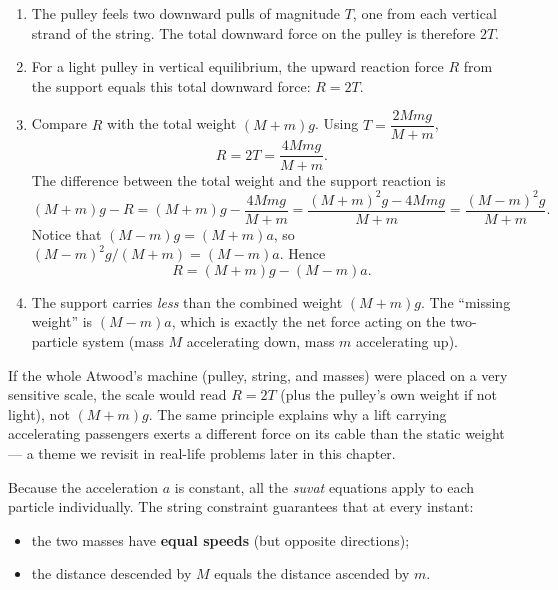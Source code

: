 \documentclass[11pt]{article}
\newcounter{popsec}
\newcounter{popsub}
\newcommand{\courssub}[1]{%
  \stepcounter{popsub}%
  \par\vspace{9pt}\noindent{\popxbold\fontsize{11.5}{13}\selectfont\color{popink}{\color{poporange}\thepopsec.\thepopsub}\hspace{6pt}#1}\par\nopagebreak\vspace{4pt}
}
\begin{document}
\begin{methode}[Force on the pulley: $R = 2T$]
\begin{enumerate}
\item The pulley feels two downward pulls of magnitude $T$, one from each vertical strand of the string. The total downward force on the pulley is therefore $2T$.
\item For a light pulley in vertical equilibrium, the upward reaction force $R$ from the support equals this total downward force: $R = 2T$.
\item Compare $R$ with the total weight $(M+m)g$. Using $T = \dfrac{2Mmg}{M+m}$,
\[ R = 2T = \frac{4Mmg}{M+m}. \]
The difference between the total weight and the support reaction is
\[ (M+m)g - R = (M+m)g - \frac{4Mmg}{M+m} = \frac{(M+m)^2g - 4Mmg}{M+m} = \frac{(M-m)^2g}{M+m}. \]
Notice that $(M-m)g = (M+m)a$, so $(M-m)^2g/(M+m) = (M-m)a$. Hence
\[ R = (M+m)g - (M-m)a. \]
\item The support carries \emph{less} than the combined weight $(M+m)g$. The ``missing weight'' is $(M-m)a$, which is exactly the net force acting on the two-particle system (mass $M$ accelerating down, mass $m$ accelerating up).
\end{enumerate}
\end{methode}

\begin{savaistu}
If the whole Atwood's machine (pulley, string, and masses) were placed on a very sensitive scale, the scale would read $R = 2T$ (plus the pulley's own weight if not light), not $(M+m)g$. The same principle explains why a lift carrying accelerating passengers exerts a different force on its cable than the static weight --- a theme we revisit in real-life problems later in this chapter.
\end{savaistu}

\courssub{Kinematics of the Machine}

Because the acceleration $a$ is constant, all the \emph{suvat} equations apply to each particle individually. The string constraint guarantees that at every instant:
\begin{itemize}
\item the two masses have \textbf{equal speeds} (but opposite directions);
\item the distance descended by $M$ equals the distance ascended by $m$.
\end{itemize}
\end{document}
